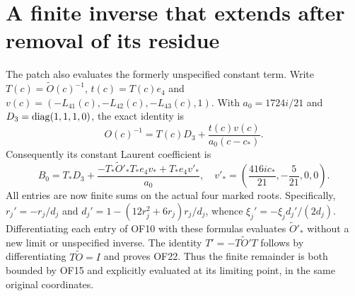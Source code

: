 \documentclass[11pt]{article}
\begin{document}
\section{A finite inverse that extends after removal of its residue}
The patch also evaluates the formerly unspecified constant term.
Write $T(c)=\widetilde O(c)^{-1}$, $t(c)=T(c)e_4$ and
$v(c)=(-L_{41}(c),-L_{42}(c),-L_{43}(c),1)$.
With $a_0=1724i/21$ and $D_3=\operatorname{diag}(1,1,1,0)$, the exact identity is
\begin{equation}
 O(c)^{-1}=T(c)D_3+\frac{t(c)v(c)}{a_0(c-c_*)}.\tag{OF21}
\end{equation}
Consequently its constant Laurent coefficient is
\begin{equation}
 B_0=T_*D_3+
 \frac{-T_*\widetilde O'_*T_*e_4v_*+T_*e_4v'_*}{a_0},
 \quad
 v'_*=\left(\frac{416ic_*}{21},-\frac5{21},0,0\right).
 \tag{OF22}
\end{equation}
All entries are now finite sums on the actual four marked roots.
Specifically, $r_j'=-r_j/d_j$ and
$d_j'=1-(12r_j^2+6r_j)r_j/d_j$, whence
$\xi_j'=-\xi_jd_j'/(2d_j)$. Differentiating each entry of OF10
with these formulas evaluates $\widetilde O'_*$ without a new
limit or unspecified inverse. The identity $T'=-T\widetilde O'T$
follows by differentiating $T\widetilde O=I$ and proves OF22.
Thus the finite remainder is both bounded by OF15 and explicitly
evaluated at its limiting point, in the same original coordinates.
\end{document}
